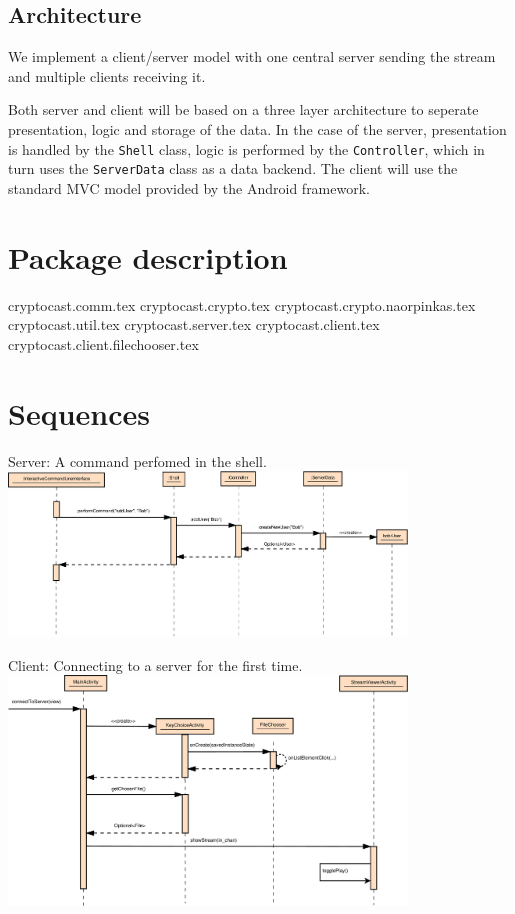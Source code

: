 \documentclass[a4paper,10pt]{scrartcl}
\begin{document}
\subsection{Architecture}

We implement a client/server model with one central server sending the stream and multiple clients
receiving it.



Both server and client will be based on a three layer architecture to seperate presentation, logic
and storage of the data.
In the case of the server, presentation is handled by the \lstinline|Shell| class, logic is
performed by the \lstinline|Controller|, which in turn uses the \lstinline|ServerData| class
as a data backend.
The client will use the standard MVC model provided by the Android framework.



\section{Package description}

{cryptocast.comm.tex}
{cryptocast.crypto.tex}
{cryptocast.crypto.naorpinkas.tex}
{cryptocast.util.tex}
{cryptocast.server.tex}
{cryptocast.client.tex}
{cryptocast.client.filechooser.tex}

\section{Sequences}
\begin{illustration}{Server: A command perfomed in the shell.}
\includegraphics [width=400px] {figures/sequence_diagram_server/Server1.pdf}
\end{illustration}
\begin{illustration}{Client: Connecting to a server for the first time.}
\includegraphics [width=400px] {figures/sequence_diagram_client/sequence_client.pdf}
\end{illustration}
\end{document}
